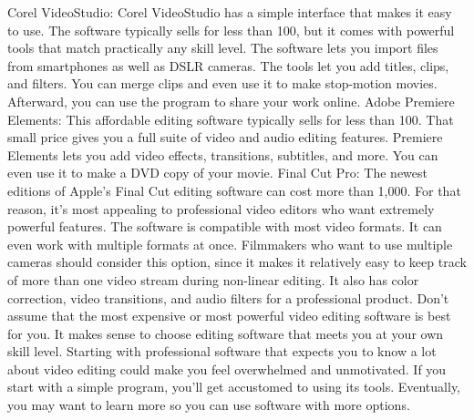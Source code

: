 Corel VideoStudio: Corel VideoStudio has a simple interface that makes it easy to use. The software typically sells for less than 100, but it comes with powerful tools that match practically any skill level. The software lets you import files from smartphones as well as DSLR cameras. The tools let you add titles, clips, and filters. You can merge clips and even use it to make stop-motion movies. Afterward, you can use the program to share your work online.
Adobe Premiere Elements: This affordable editing software typically sells for less than 100. That small price gives you a full suite of video and audio editing features. Premiere Elements lets you add video effects, transitions, subtitles, and more. You can even use it to make a DVD copy of your movie.
Final Cut Pro: The newest editions of Apple's Final Cut editing software can cost more than 1,000. For that reason, it's most appealing to professional video editors who want extremely powerful features. The software is compatible with most video formats. It can even work with multiple formats at once. Filmmakers who want to use multiple cameras should consider this option, since it makes it relatively easy to keep track of more than one video stream during non-linear editing. It also has color correction, video transitions, and audio filters for a professional product.
Don't assume that the most expensive or most powerful video editing software is best for you. It makes sense to choose editing software that meets you at your own skill level. Starting with professional software that expects you to know a lot about video editing could make you feel overwhelmed and unmotivated. If you start with a simple program, you'll get accustomed to using its tools. Eventually, you may want to learn more so you can use software with more options.

